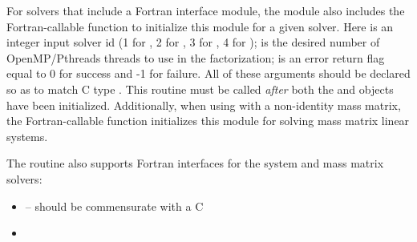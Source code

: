For solvers that include a Fortran interface module, the
{\sunlinsolslumt} module also includes the Fortran-callable
function  to initialize this
{\sunlinsolslumt} module for a given {\sundials} solver.  Here 
is an integer input solver id (1 for {\cvode}, 2 for {\ida}, 3 for {\kinsol},
4 for {\arkode});  is the desired number of
OpenMP/Pthreads threads to use in the factorization;  is an
error return flag equal to 0 for success and -1 for failure.  All of
these arguments should be declared so as to match C type .
This routine must be called \emph{after} both the {\nvector} and
{\sunmatrix} objects have been initialized.  Additionally, when using
{\arkode} with a non-identity mass matrix, the Fortran-callable function
 initializes this
{\sunlinsolslumt} module for solving mass matrix linear systems.

The  routine also supports Fortran
interfaces for the system and mass matrix solvers:
\begin{itemize}
\item {} -- 
  should be commensurate with a C 
\item {}
\end{itemize}
